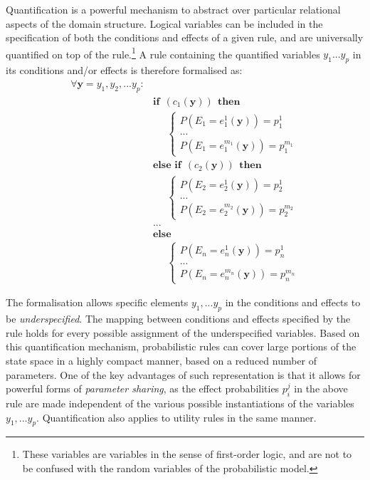 Quantification is a powerful mechanism to abstract over particular relational aspects of the domain structure.  Logical variables can be included in the specification of both the conditions and effects of a given rule, and are universally quantified on top of the rule.\footnote{These variables are variables in the sense of first-order logic, and are not to be confused with the random variables of the probabilistic model.}  A rule containing the quantified variables $y_1...y_p$ in its conditions and/or effects is therefore formalised as:
\begin{equation}
\begin{aligned}
\forall \mathbf{y} = y_1, y_2,...y_p: \\
& \textbf{if} \ \ (c_{1}(\mathbf{y})) \ \ \textbf{then} \\ 
& \;\;\;\;\; \begin{cases}
P(E_1\!=\!e_1^1(\mathbf{y})) = p_1^1 \\
 ... \\
P(E_1\!=\!e_1^{m_1}(\mathbf{y})) = p_1^{m_1} 
\end{cases} \\[3mm]
& \textbf{else if} \ \ (c_{2}(\mathbf{y})) \ \ \textbf{then} \\ 
& \;\;\;\;\; \begin{cases}
P(E_2\!=\!e_2^1(\mathbf{y})) = p_2^1 \\
 ... \\
P(E_2\!=\!e_2^{m_2}(\mathbf{y})) = p_2^{m_2} 
\end{cases} \\ 
& ...  \\
& \textbf{else} \\
& \;\;\;\;\; \begin{cases}
P(E_n\!=\!e_n^1(\mathbf{y})) = p_n^1 \\
... \\
P(E_n\!=\!e_n^{m_n}(\mathbf{y})) = p_n^{m_n}
\end{cases}
\end{aligned}
\label{eq:rulewithquant}
\end{equation}

The formalisation allows specific elements $y_1,...y_p$ in the conditions and effects to be \textit{underspecified}.  The mapping between conditions and effects specified by the rule holds for every possible assignment of the underspecified variables. Based on this quantification mechanism, probabilistic rules can cover large portions of the state space in a highly compact manner, based on a reduced number of parameters. One of the key advantages of such representation is that it allows for powerful forms of \textit{parameter sharing}, as the effect probabilities $p_i^j$ in the above rule are made independent of the various possible instantiations of the variables $y_1,...y_p$. Quantification also applies to utility rules in the same manner. 

